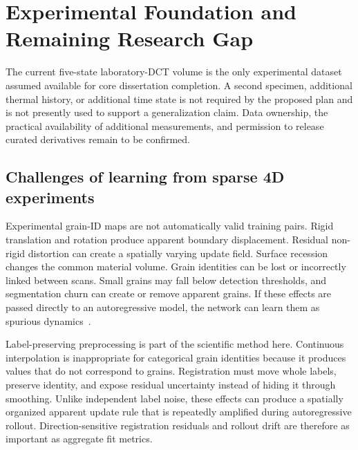 \documentclass[proposalMode]{ufdissertation}
\begin{document}
\chapter{Experimental Foundation and Remaining Research Gap}

The current five-state laboratory-DCT volume is the only experimental dataset assumed available for core dissertation completion. A second specimen, additional thermal history, or additional time state is not required by the proposed plan and is not presently used to support a generalization claim. Data ownership, the practical availability of additional measurements, and permission to release curated derivatives remain to be confirmed.

\section{Challenges of learning from sparse 4D experiments}

Experimental grain-ID maps are not automatically valid training pairs. Rigid translation and rotation produce apparent boundary displacement. Residual non-rigid distortion can create a spatially varying update field. Surface recession changes the common material volume. Grain identities can be lost or incorrectly linked between scans. Small grains may fall below detection thresholds, and segmentation churn can create or remove apparent grains. If these effects are passed directly to an autoregressive model, the network can learn them as spurious dynamics~\cite{tian2026experiment}.

Label-preserving preprocessing is part of the scientific method here. Continuous interpolation is inappropriate for categorical grain identities because it produces values that do not correspond to grains. Registration must move whole labels, preserve identity, and expose residual uncertainty instead of hiding it through smoothing.
Unlike independent label noise, these effects can produce a spatially organized apparent update rule that is repeatedly amplified during autoregressive rollout. Direction-sensitive registration residuals and rollout drift are therefore as important as aggregate fit metrics.
\end{document}
